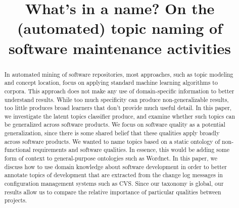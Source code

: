 \documentclass[10pt, conference, compsocconf]{IEEEtran}
\begin{document}
 
\author{
\and
{}
}

\title{What's in a name? On the (automated) topic naming of software maintenance activities}

\maketitle
\thispagestyle{empty}

\begin{abstract}
  In automated mining of software repositories, most approaches, such as topic modeling and concept location, focus on applying standard machine learning algorithms to corpora. This approach does not make any use of domain-specific information to better understand results. While too much specificity can produce non-generalizable results, too little produces broad learners that don't provide much useful detail.%
In this paper, we investigate the latent topics classifier produce, and examine  whether such topics can be
  generalized across software products. We focus on software quality
  as a potential generalization, since there is some shared belief
  that these qualities apply broadly across software products. We
  wanted to name topics based on a static ontology of non-functional
  requirements and software qualities. %
In essence, this would be adding some form
  of context to general-purpose ontologies such as Wordnet. In this
  paper, we discuss how to use domain knowledge about software
  development in order to better annotate topics of development that
  are extracted from the change log messages in configuration
  management systems such as CVS. Since our taxonomy is global, our results allow us to compare the relative importance of particular qualities between projects.
\end{abstract}
\end{document}
